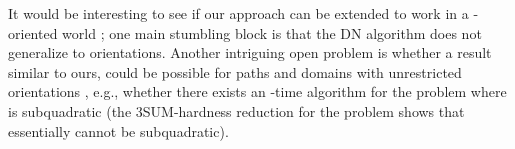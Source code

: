 \documentclass[english,runningheads,11pt]{llncs-revised}
\begin{document}
It would be interesting to see if our approach can be extended to work in a -oriented world \cite{ref:AdegeestMi94,ref:HershbergerCo94,ref:MitchellMi14}; one main stumbling block is that the DN algorithm does not generalize to  orientations. Another intriguing open problem is whether a result similar to ours, could be possible for paths and domains with unrestricted orientations \cite{ref:MitchellMi92}, e.g., whether there exists an -time algorithm for the problem where  is subquadratic (the 3SUM-hardness reduction \cite{ref:MitchellMi14} for the problem shows that  essentially cannot be subquadratic).














\end{document}
